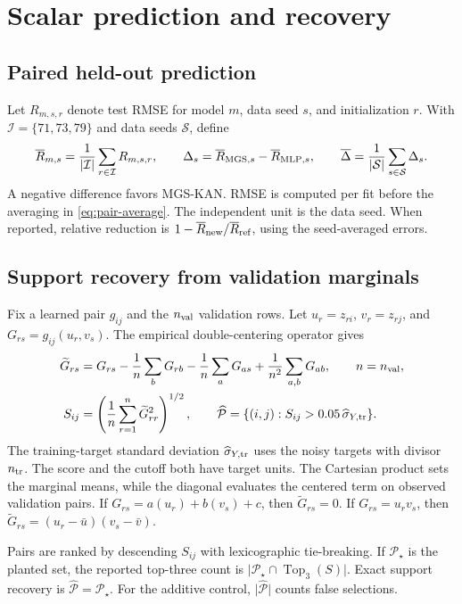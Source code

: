 \documentclass[11pt]{article}
\let\StudyMathSection\section
\let\StudyMathSubsection\subsection
\newcommand{\setP}{\mathcal{P}}
\begin{document}
\StudyMathSection{Scalar prediction and recovery}

\StudyMathSubsection{Paired held-out prediction}

Let \(R_{m,s,r}\) denote test RMSE for model \(m\), data seed \(s\), and
initialization \(r\). With \(\mathcal I=\{71,73,79\}\) and data seeds
\(\mathcal S\), define
\begin{equation}
 \overline R_{m,s}=\frac{1}{|\mathcal I|}\sum_{r\in\mathcal I} R_{m,s,r},
 \qquad
 \Delta_s=\overline R_{{\rm MGS},s}-\overline R_{{\rm MLP},s},
 \qquad
 \overline\Delta=\frac{1}{|\mathcal S|}\sum_{s\in\mathcal S}\Delta_s .
 \label{eq:pair-average}
\end{equation}
A negative difference favors MGS-KAN. RMSE is computed per fit before the
averaging in \eqref{eq:pair-average}. The independent unit is the data seed.
When reported, relative reduction is \(1-\overline R_{\rm new}/\overline
R_{\rm ref}\), using the seed-averaged errors.

\StudyMathSubsection{Support recovery from validation marginals}

Fix a learned pair \(g_{ij}\) and the \(n_{\rm val}\) validation rows.
Let \(u_r=z_{ri}\), \(v_r=z_{rj}\), and
\(G_{rs}=g_{ij}(u_r,v_s)\). The empirical double-centering operator gives
\begin{align}
 \widetilde G_{rs}
 &= G_{rs}-\frac1n\sum_b G_{rb}-\frac1n\sum_a G_{as}
          +\frac1{n^2}\sum_{a,b}G_{ab},\qquad n=n_{\rm val},\nonumber\\
 S_{ij}&=\left(\frac1n\sum_{r=1}^n\widetilde G_{rr}^2\right)^{1/2},
 \qquad
 \widehat{\setP}
   =\{(i,j): S_{ij}>0.05\,\widehat\sigma_{Y,{\rm tr}}\}.
 \label{eq:validation-recovery}
\end{align}
The training-target standard deviation \(\widehat\sigma_{Y,{\rm tr}}\)
uses the noisy targets with divisor \(n_{\rm tr}\). The score and the
cutoff both have target units. The Cartesian product sets the marginal
means, while the diagonal evaluates the centered term on observed
validation pairs. If \(G_{rs}=a(u_r)+b(v_s)+c\), then
\(\widetilde G_{rs}=0\). If \(G_{rs}=u_rv_s\), then
\(\widetilde G_{rs}=(u_r-\bar u)(v_s-\bar v)\).

Pairs are ranked by descending \(S_{ij}\) with lexicographic tie-breaking.
If \(\setP_\star\) is the planted set, the reported top-three count is
\(\lvert\setP_\star\cap\operatorname{Top}_3(S)\rvert\).
Exact support recovery is \(\widehat{\setP}=\setP_\star\).
For the additive control, \(\lvert\widehat{\setP}\rvert\) counts false
selections.
\end{document}
